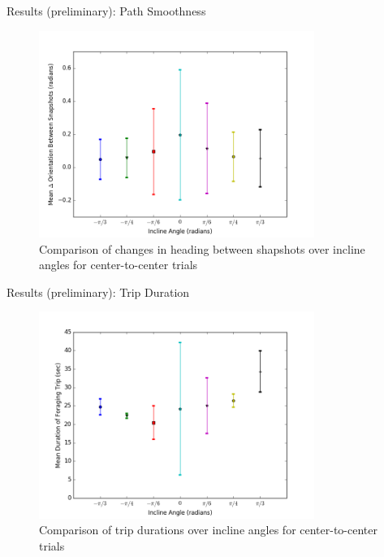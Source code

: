 \begin{frame}{Results (preliminary): Path Smoothness}
\begin{figure}
\includegraphics[width=0.8\textwidth]{results/center-to-center_meandeltaorientationbetweensnapshots.png}
\caption{Comparison of changes in heading between shapshots over incline angles for center-to-center trials}
\end{figure}
\end{frame}

\begin{frame}{Results (preliminary): Trip Duration}
\begin{figure}
\includegraphics[width=0.8\textwidth]{results/center-to-centermeandurationofforagingtrip.png}
\caption{Comparison of trip durations over incline angles for center-to-center trials}
\end{figure}
\end{frame}

